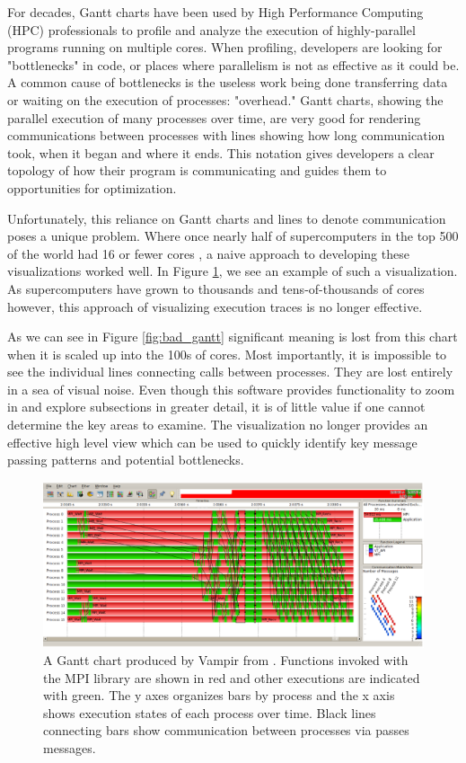 For decades, Gantt charts have been used by High Performance Computing (HPC) professionals to profile and analyze the execution of highly-parallel programs running on multiple cores. When profiling, developers are looking for "bottlenecks" in code, or places where parallelism is not as effective as it could be. A common cause of bottlenecks is the useless work being done transferring data or waiting on the execution of processes: "overhead." Gantt charts, showing the parallel execution of many processes over time, are very good for rendering communications between processes with lines showing how long communication took, when it began and where it ends. This notation gives developers a clear topology of how their program is communicating and guides them to opportunities for optimization.

Unfortunately, this reliance on Gantt charts and lines to denote communication poses a unique problem. Where once nearly half of supercomputers in the top 500 of the world had 16 or fewer cores \cite{top500}, a naive approach to developing these visualizations worked well. In Figure \ref{fig:simple_gantt}, we see an example of such a visualization. As supercomputers have grown to thousands and tens-of-thousands of cores however, this approach of visualizing execution traces is no longer effective.

As we can see in Figure \ref{fig:bad_gantt} significant meaning is lost from this chart when it is scaled up into the 100s of cores. Most importantly, it is impossible to see the individual lines connecting calls between processes. They are lost entirely in a sea of visual noise. Even though this software provides functionality to zoom in and explore subsections in greater detail, it is of little value if one cannot determine the key areas to examine. The visualization no longer provides an effective high level view which can be used to quickly identify key message passing patterns and potential bottlenecks.


\begin{figure}[h]
    \centering
    \includegraphics[width=.4\textwidth]{figs/basic_gantt.png}
    \caption{A Gantt chart produced by Vampir from \cite{isaacs2014state}. Functions invoked with the MPI library are shown in red and other executions are indicated with green. The y axes organizes bars by process and the x axis shows execution states of each process over time. Black lines connecting bars show communication between processes via passes messages.}
    \label{fig:simple_gantt}
\end{figure}

